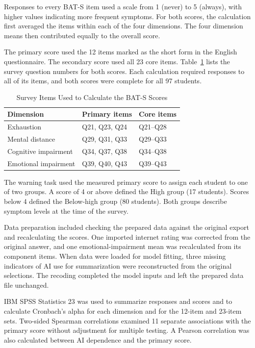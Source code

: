 Responses to every BAT-S item used a scale from 1 (never) to 5 (always), with higher values indicating more frequent symptoms. For both scores, the calculation first averaged the items within each of the four dimensions. The four dimension means then contributed equally to the overall score.

The primary score used the 12 items marked as the short form in the English questionnaire. The secondary score used all 23 core items. Table~\ref{tab:bats-items} lists the survey question numbers for both scores. Each calculation required responses to all of its items, and both scores were complete for all 97 students.

\begin{table}[t]
\caption{Survey Items Used to Calculate the BAT-S Scores}
\label{tab:bats-items}
\centering
\footnotesize
\begin{tabular}{@{}lll@{}}
\hline
Dimension & Primary items & Core items \\
\hline
Exhaustion & Q21, Q23, Q24 & Q21--Q28 \\
Mental distance & Q29, Q31, Q33 & Q29--Q33 \\
Cognitive impairment & Q34, Q37, Q38 & Q34--Q38 \\
Emotional impairment & Q39, Q40, Q43 & Q39--Q43 \\
\hline
\end{tabular}
\end{table}

The warning task used the measured primary score to assign each student to one of two groups. A score of 4 or above defined the High group (17 students). Scores below 4 defined the Below-high group (80 students). Both groups describe symptom levels at the time of the survey.

Data preparation included checking the prepared data against the original export and recalculating the scores. One imported internet rating was corrected from the original answer, and one emotional-impairment mean was recalculated from its component items. When data were loaded for model fitting, three missing indicators of AI use for summarization were reconstructed from the original selections. The recoding completed the model inputs and left the prepared data file unchanged.

IBM SPSS Statistics 23 was used to summarize responses and scores and to calculate Cronbach's alpha for each dimension and for the 12-item and 23-item sets. Two-sided Spearman correlations examined 11 separate associations with the primary score without adjustment for multiple testing. A Pearson correlation was also calculated between AI dependence and the primary score.

